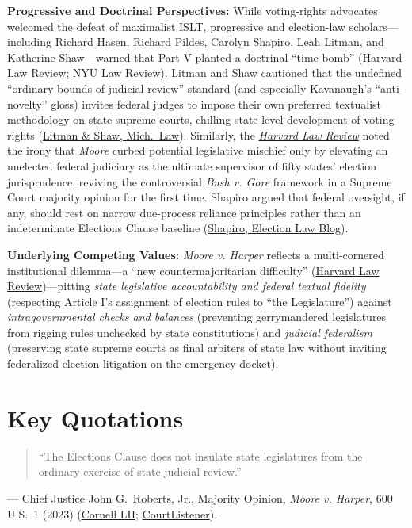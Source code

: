 \documentclass[12pt]{article}
\begin{document}
\textbf{Progressive and Doctrinal Perspectives:} While voting-rights advocates welcomed the defeat of maximalist ISLT, progressive and election-law scholars---including Richard Hasen, Richard Pildes, Carolyn Shapiro, Leah Litman, and Katherine Shaw---warned that Part V planted a doctrinal ``time bomb'' (\href{https://harvardlawreview.org/print/vol-137/moore-v-harper/}{Harvard Law Review}; \href{https://nyulawreview.org/wp-content/uploads/2024/12/99-NYU-L-Rev-2049.pdf}{NYU Law Review}). Litman and Shaw cautioned that the undefined ``ordinary bounds of judicial review'' standard (and especially Kavanaugh's ``anti-novelty'' gloss) invites federal judges to impose their own preferred textualist methodology on state supreme courts, chilling state-level development of voting rights (\href{https://repository.law.umich.edu/cgi/viewcontent.cgi?article=3950&context=facarticles}{Litman \& Shaw, Mich.\ Law}). Similarly, the \href{https://harvardlawreview.org/print/vol-137/moore-v-harper/}{\textit{Harvard Law Review}} noted the irony that \textit{Moore} curbed potential legislative mischief only by elevating an unelected federal judiciary as the ultimate supervisor of fifty states' election jurisprudence, reviving the controversial \textit{Bush v. Gore} framework in a Supreme Court majority opinion for the first time. Shapiro argued that federal oversight, if any, should rest on narrow due-process reliance principles rather than an indeterminate Elections Clause baseline (\href{https://electionlawblog.org/2023/carolyn-shapiro-moore-v-harper-and-state-courts/}{Shapiro, Election Law Blog}).

\textbf{Underlying Competing Values:} \textit{Moore v. Harper} reflects a multi-cornered institutional dilemma---a ``new countermajoritarian difficulty'' (\href{https://harvardlawreview.org/print/vol-137/moore-v-harper/}{Harvard Law Review})---pitting \textit{state legislative accountability and federal textual fidelity} (respecting Article I's assignment of election rules to ``the Legislature'') against \textit{intragovernmental checks and balances} (preventing gerrymandered legislatures from rigging rules unchecked by state constitutions) and \textit{judicial federalism} (preserving state supreme courts as final arbiters of state law without inviting federalized election litigation on the emergency docket).

\section{Key Quotations}
\begin{quote}
``The Elections Clause does not insulate state legislatures from the ordinary exercise of state judicial review.''
\end{quote}
\noindent --- Chief Justice John G.\ Roberts, Jr., Majority Opinion, \textit{Moore v. Harper}, 600 U.S.\ 1 (2023) (\href{https://www.law.cornell.edu/supremecourt/text/21-1271}{Cornell LII}; \href{https://www.courtlistener.com/opinion/10049660/moore-v-harper/}{CourtListener}).
\end{document}
